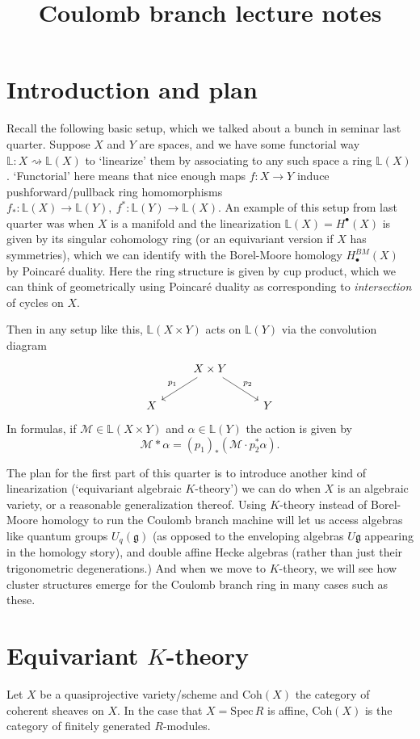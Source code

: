 \documentclass[11pt]{amsart}
\title[Math 520]{{Coulomb branch lecture notes }}
\theoremstyle{definition}
\newcommand{\g}{\mathfrak{g}}
\newcommand{\Spec}{\mathrm{Spec}\,}
\newcommand{\Coh}{\mathrm{Coh}}
\newcommand{\Lbb}{\mathbb{L}}
\numberwithin{equation}{subsection}
\numberwithin{figure}{subsection}
\begin{document}
\maketitle
\tableofcontents

\section{Introduction and plan}
Recall the following basic setup, which we talked about a bunch in seminar last quarter. Suppose $X$ and $Y$ are spaces, and we have some functorial way $\mathbb{L}\colon X\rightsquigarrow \mathbb{L}(X)$ 
to `linearize' them by associating to any such space a ring $\Lbb(X)$. `Functorial' here means that nice enough maps $f:X\rightarrow Y$ induce pushforward/pullback ring homomorphisms $f_*:\Lbb(X)\rightarrow\Lbb(Y),~f^*:\Lbb(Y)\rightarrow\Lbb(X)$. An example of this setup from last quarter was when $X$ is a manifold and the linearization $\Lbb(X)=H^\bullet(X)$ is given by its singular cohomology ring (or an equivariant version if $X$ has symmetries), which we can identify with the Borel-Moore homology $H^{BM}_\bullet(X)$ by Poincar\'e duality. Here the ring structure is given by cup product, which we can think of geometrically using Poincar\'e duality as corresponding to \emph{intersection} of cycles on $X$.

Then in any setup like this, $\Lbb(X\times Y)$ acts on $\Lbb(Y)$ via the convolution diagram
$$
\begin{tikzcd}
& X\times Y \arrow{dl}[swap]{p_1}\arrow{dr}{p_2}  & \\
X& & Y
\end{tikzcd}
$$
In formulas, if $\mathcal{M}\in\Lbb(X\times Y)$ and $\alpha\in \Lbb(Y)$ the action is given by
$$
\mathcal{M}*\alpha = (p_1)_*\left(\mathcal{M}\cdot p_2^*\alpha\right).
$$

The plan for the first part of this quarter is to introduce another kind of linearization (`equivariant algebraic $K$-theory') we can do when $X$ is an algebraic variety, or a reasonable generalization thereof. Using $K$-theory instead of Borel-Moore homology to run the Coulomb branch machine will let us access algebras like quantum groups $U_q(\g)$ (as opposed to the enveloping algebras $U\g$ appearing in the homology story), and double affine Hecke algebras (rather than just their trigonometric degenerations.) And when we move to $K$-theory, we will see how cluster structures emerge for the Coulomb branch ring in many cases such as these. 

\section{Equivariant $K$-theory}
Let $X$ be a quasiprojective variety/scheme and $\Coh(X)$ the category of coherent sheaves on $X$. In the case that $X=\Spec R$ is affine, $\Coh(X)$ is the category of finitely generated $R$-modules. 
\end{document}
